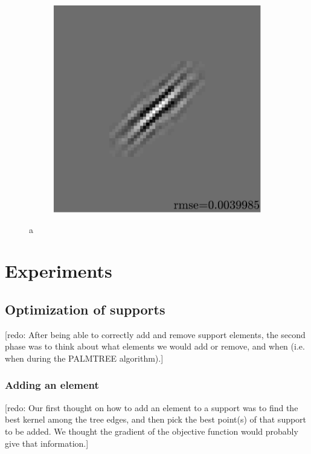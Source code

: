 \begin{figure}[!ht]
\begin{subfigure}[b]{0.09\textwidth}
	\caption{}
\end{subfigure}
\begin{subfigure}[b]{0.39\textwidth}\centering
	\includegraphics[width=\textwidth]{figures/exple-better-support/xp_128x128_sc2_angl1_K3_S3_node4expected_approx.pdf}
	\caption{}
\end{subfigure}
\caption{a} \label{fig_fixed_vs_expected}
\end{figure}

\chapter{Experiments}

\section{Optimization of supports}

[redo: After being able to correctly add and remove support elements, the second phase was to think about what elements we would add or remove, and when (i.e. when during the PALMTREE algorithm).]


\subsection{Adding an element}
[redo: Our first thought on how to add an element to a support was to find the best kernel among the tree edges, and then pick the best point(s) of that support to be added. We thought the gradient of the objective function would probably give that information.]

